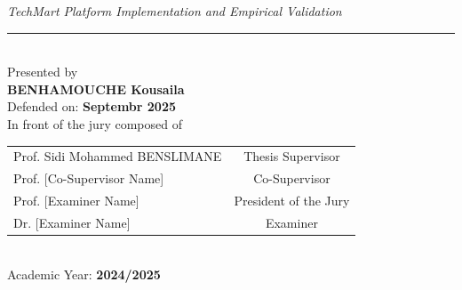 \begin{center}
{\normalsize \textit{TechMart Platform Implementation and Empirical Validation}} \\[0.5cm]

\rule{14cm}{0.5pt} \\[0.7cm]

{\normalsize Presented by} \\[0.3cm]
{\large \textbf{BENHAMOUCHE Kousaila}} \\[0.6cm]

{\normalsize Defended on: \textbf{Septembr 2025}} \\[0.3cm]
{\normalsize In front of the jury composed of} \\[0.5cm]

{\normalsize
\begin{tabular}{lc}
Prof. Sidi Mohammed BENSLIMANE & Thesis Supervisor \\[0.3cm]
Prof. [Co-Supervisor Name] & Co-Supervisor \\[0.3cm]
Prof. [Examiner Name] & President of the Jury \\[0.3cm]
Dr. [Examiner Name] & Examiner \\
\end{tabular}} \\[0.8cm]

{\normalsize Academic Year: \textbf{2024/2025}}

\end{center}

\restoregeometry
\newpage